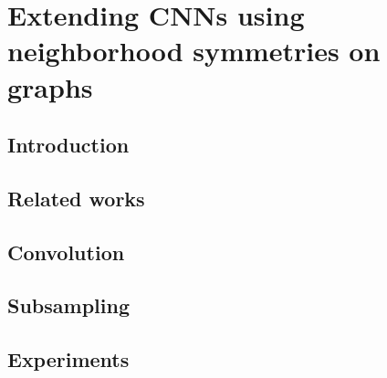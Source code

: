 \section{Extending CNNs using neighborhood symmetries on graphs}

\subsection{Introduction}

\subsection{Related works}

\subsection{Convolution}

\subsection{Subsampling}

\subsection{Experiments}